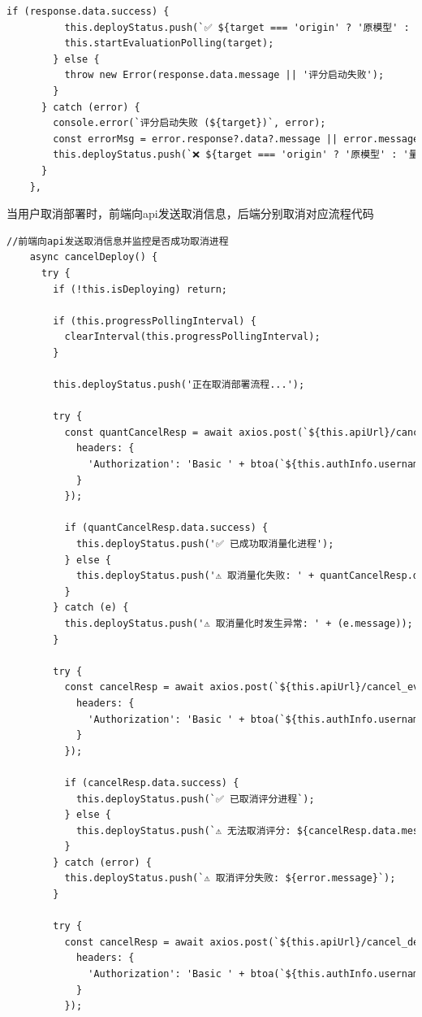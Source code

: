 \documentclass[AutoFakeBold,AutoFakeSlant,language=chinese,degree=bachelor]{sustechthesis}
\begin{document}
\begin{itemize}
\begin{lstlisting}[language=HTML]
        if (response.data.success) {
          this.deployStatus.push(`✅ ${target === 'origin' ? '原模型' : '量化模型'} 评分任务已启动`);
          this.startEvaluationPolling(target);
        } else {
          throw new Error(response.data.message || '评分启动失败');
        }
      } catch (error) {
        console.error(`评分启动失败 (${target})`, error);
        const errorMsg = error.response?.data?.message || error.message;
        this.deployStatus.push(`❌ ${target === 'origin' ? '原模型' : '量化模型'} 评分启动失败: ${error.message}`);
      }
    },
    \end{lstlisting}
    当用户取消部署时，前端向api发送取消信息，后端分别取消对应流程代码
    \begin{lstlisting}[language=HTML]
    //前端向api发送取消信息并监控是否成功取消进程
    async cancelDeploy() {
      try {
        if (!this.isDeploying) return;

        if (this.progressPollingInterval) {
          clearInterval(this.progressPollingInterval);
        }

        this.deployStatus.push('正在取消部署流程...');

        try {
          const quantCancelResp = await axios.post(`${this.apiUrl}/cancel_quant`, {}, {
            headers: {
              'Authorization': 'Basic ' + btoa(`${this.authInfo.username}:${this.authInfo.password}`)
            }
          });

          if (quantCancelResp.data.success) {
            this.deployStatus.push('✅ 已成功取消量化进程');
          } else {
            this.deployStatus.push('⚠️ 取消量化失败: ' + quantCancelResp.data.message);
          }
        } catch (e) {
          this.deployStatus.push('⚠️ 取消量化时发生异常: ' + (e.message));
        }

        try {
          const cancelResp = await axios.post(`${this.apiUrl}/cancel_eval`, {}, {
            headers: {
              'Authorization': 'Basic ' + btoa(`${this.authInfo.username}:${this.authInfo.password}`)
            }
          });

          if (cancelResp.data.success) {
            this.deployStatus.push(`✅ 已取消评分进程`);
          } else {
            this.deployStatus.push(`⚠️ 无法取消评分: ${cancelResp.data.message}`);
          }
        } catch (error) {
          this.deployStatus.push(`⚠️ 取消评分失败: ${error.message}`);
        }

        try {
          const cancelResp = await axios.post(`${this.apiUrl}/cancel_deployment`, {}, {
            headers: {
              'Authorization': 'Basic ' + btoa(`${this.authInfo.username}:${this.authInfo.password}`)
            }
          });


\end{lstlisting}
\end{itemize}
\end{document}

